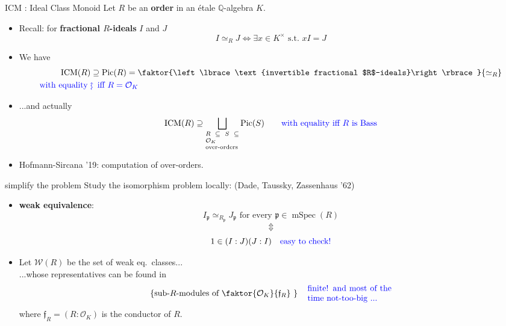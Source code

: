 \documentclass[usenames,dvipsnames,handout]{beamer}
\def\Q{\mathbb{Q}}
\DeclareMathOperator{\ICM}{ICM}
\DeclareMathOperator{\Pic}{Pic}
\DeclareMathOperator{\mSpec}{mSpec}
\newcommand{\cO}{{\mathcal O}}
\newcommand{\cW}{{\mathcal W}}
\newcommand{\p}{{\mathfrak p}}
\newcommand{\frf}{{\mathfrak f}}
\newcommand{\set}[1]{\left\lbrace#1\right\rbrace }
\newcommand{\blue}[1]{\textcolor{blue}{#1}}
\begin{document}
\begin{frame}{ICM : Ideal Class Monoid}
    Let $R$ be an {\bf order} in an \'etale  $\Q$-algebra $K$.
    \begin{itemize}
\pause
    \item Recall: for {\bf fractional $R$-ideals} $I$ and $J$
	 \[ I\simeq_R J \Longleftrightarrow \exists x \in K^\times \text{ s.t.~} xI=J \]
\pause
    \item We have
   	\begin{align*}
    \ICM(R) & \supseteq \Pic(R)=\faktor{\set{\text{invertible fractional $R$-ideals}}}{\simeq_R} \\
	\blue{\text{with equality }} & \blue{\rotatebox[origin=c]{90}{$\large\rightsquigarrow$}\mkern2mu \text{ iff } R=\cO_K }
    \end{align*}
\pause 
    \item ...and actually
    \[ \ICM(R) \supseteq \bigsqcup_{\scriptsize\parbox{5 em}{$R\subseteq S \subseteq \cO_K$\\over-orders}}\Pic(S) \qquad   
     \textcolor{blue}{\text{with equality iff $R$ is Bass}} \]
\pause
    \item Hofmann-Sircana '19: computation of over-orders.
\end{itemize}
\end{frame}

\begin{frame}{ simplify the problem  }
    Study the isomorphism problem locally: (Dade, Taussky, Zassenhaus '62)
    \begin{itemize}
\pause 
    \item  \textbf{weak equivalence}:
    \[I_{\p}\simeq_{R_{\p}} J_{\p} \text{ for every } {\p} \in \mSpec(R)\]
\pause
    \vspace{-6mm}\[\Updownarrow\]
    \[1\in (I:J)(J:I)\quad \textcolor{blue}{\text{easy to check!}}\]
\pause
    \item Let $\cW(R)$ be the set of weak eq.~classes...\\
\pause
    ...whose representatives can be found in
    \[\set{\text{sub-$R$-modules of $\faktor{\cO_K}{\frf_R}$ }} \quad \textcolor{blue}{\parbox{10 em}{finite! and most of the time not-too-big ...}}\]
    where $\frf_R=(R:\cO_K)$ is the conductor of $R$.
    \end{itemize}
\end{frame}
\end{document}
